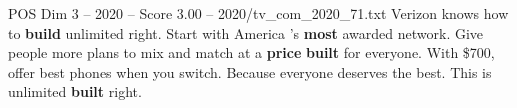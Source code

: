 \begin{textsample}{POS Dim 3 – 2020 – Score 3.00 – 2020/tv\_com\_2020\_71.txt}  \label{ex:f3_pos_063}
Verizon knows how to \textbf{build} unlimited right.
Start with America 's \textbf{most} awarded network.
Give people more plans to mix and match at a \textbf{price} \textbf{built} for everyone.
With \$700, offer best phones when you switch.
Because everyone deserves the best.
This is unlimited \textbf{built} right.

\end{textsample}
